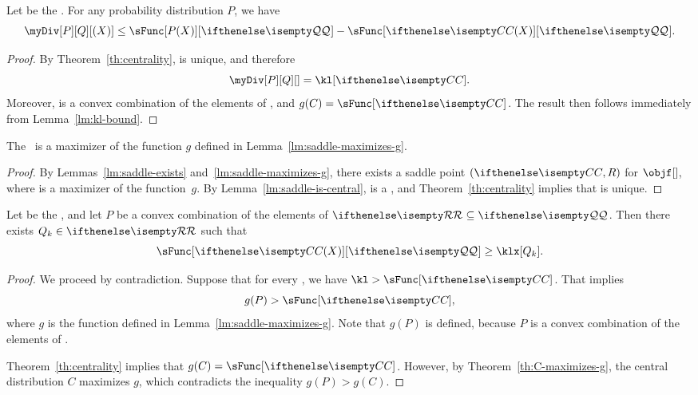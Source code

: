 \begin{corollary}
    \label{cor:cdiv-lambda-bound}
    Let \cDist be the \cd.
    For any probability distribution $P$, we have
    \begin{equation*}
        \myDiv[P][Q][(X)] \leq \sFunc[P(X)][\setQ] - \sFunc[\cDist(X)][\setQ].
    \end{equation*}
\end{corollary}

\begin{proof}
    By Theorem~\ref{th:centrality}, \cDist is unique,
    and therefore
    \[
        \myDiv[P][Q][] = \kl[\cDist].
    \]
    Moreover, \cDist is a convex combination of the elements of \setQ, and $g(C) = \sFunc[\cDist]$.
    The result then follows immediately from Lemma~\ref{lm:kl-bound}.
\end{proof}

\begin{theorem}
    \label{th:C-maximizes-g}
    The \cd\ is a maximizer of the function $g$ defined in Lemma~\ref{lm:saddle-maximizes-g}.
\end{theorem}

\begin{proof}
    By Lemmas~\ref{lm:saddle-exists} and~\ref{lm:saddle-maximizes-g}, there exists a saddle point $(\cDist, R)$
    for $\objf[]$, where \cDist is a maximizer of the function~$g$.
    By Lemma~\ref{lm:saddle-is-central}, \cDist is a \cd, and Theorem~\ref{th:centrality} implies that \cDist is unique.
\end{proof}

\begin{corollary}
    \label{cor:imperfection}
    Let \cDist be the \cd,
    and let $P$ be a convex combination of the elements of $\set{R} \subseteq \setQ$.
    Then there exists $Q_k \in \set{R}$ such that
    \begin{equation*}
        \sFunc[\cDist(X)][\setQ] \geq \klx[Q_k].
    \end{equation*}
\end{corollary}

\begin{proof}
    We proceed by contradiction.
    Suppose that for every , we have $\kl > \sFunc[\cDist]$.
    That implies
    \[
        g(P) > \sFunc[\cDist],
    \]
    where $g$ is the function defined in Lemma~\ref{lm:saddle-maximizes-g}.
    Note that $g(P)$ is defined, because $P$ is a convex combination of the elements of \setQ.

    Theorem~\ref{th:centrality} implies that $g(C) = \sFunc[\cDist]$.
    However, by Theorem~\ref{th:C-maximizes-g}, the central distribution $C$ maximizes $g$, which
    contradicts the inequality $g(P) > g(C)$.
\end{proof}

